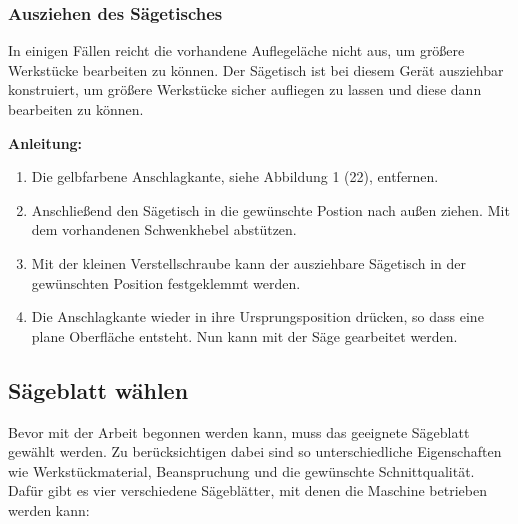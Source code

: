 \documentclass{\basedir/fablab-document}
\begin{document}
\subsubsection{Ausziehen des Sägetisches}

In einigen Fällen reicht die vorhandene Auflegeläche nicht aus, um größere Werkstücke bearbeiten zu können. Der Sägetisch ist bei diesem Gerät ausziehbar konstruiert, um größere Werkstücke sicher aufliegen zu lassen und diese dann bearbeiten zu können. 


\textbf{Anleitung:} \\
\renewcommand{\labelenumi}{\alph{enumi})}
\begin{enumerate}
	\item Die gelbfarbene Anschlagkante, siehe Abbildung 1 (22), entfernen.
	\item Anschließend den Sägetisch in die gewünschte Postion nach außen ziehen. Mit dem vorhandenen Schwenkhebel abstützen.
	\item Mit der kleinen Verstellschraube kann der ausziehbare Sägetisch in der gewünschten Position festgeklemmt werden.
	\item Die Anschlagkante wieder in ihre Ursprungsposition drücken, so dass eine plane Oberfläche entsteht. Nun kann mit der Säge gearbeitet werden.
\end{enumerate}

\subsection{Sägeblatt  wählen}
Bevor mit der Arbeit begonnen werden kann, muss das geeignete Sägeblatt gewählt werden. Zu berücksichtigen dabei sind so unterschiedliche Eigenschaften wie Werkstückmaterial, Beanspruchung und die gewünschte Schnittqualität. Dafür gibt es vier verschiedene Sägeblätter, mit denen die Maschine betrieben werden kann:
\end{document}

